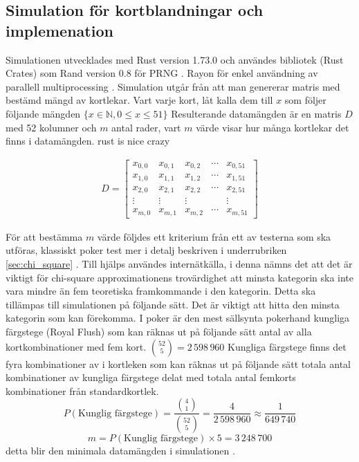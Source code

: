 \documentclass[a4paper]{article}
\begin{document}
\subsection{Simulation för kortblandningar och implemenation}

Simulationen utvecklades med Rust version 1.73.0 och användes bibliotek (Rust
Crates) som Rand version 0.8 för PRNG \parencite{rand_crate}. Rayon för enkel
användning av  parallell multiprocessing \parencite{rayon_crate}. Simulation
utgår från att man genererar matris med bestämd mängd av kortlekar. Vart varje
kort, låt kalla dem till $x$ som följer följande mängden $\{x \in \mathbb{N},  0 \leq x \leq 51 \}$
Resulterande datamängden är en matris $D$ med 52 kolumner och $m$ antal rader, vart
$m$ värde visar hur många kortlekar det finns i datamängden.
rust is nice crazy

\begin{align}
	D = \begin{bmatrix}
		x_{0,0} & x_{0,1} & x_{0,2} & \cdots & x_{0,51}\\ 
		x_{1,0} & x_{1,1} & x_{1,2} & \cdots & x_{1,51}\\
		x_{2,0} & x_{2,1} & x_{2,2} & \cdots & x_{2,51}\\
		\vdots & \vdots & \vdots & \; & \vdots \\
		x_{m,0} & x_{m,1} & x_{m,2} & \cdots & x_{m,51}
	\end{bmatrix}
\end{align}

För att bestämma $m$ värde följdes ett kriterium från ett av testerna som ska
utföras, klassiskt poker test mer i  detalj beskriven i underrubriken
\ref{sec:chi_square} . Till hjälps användes \parencite{nist} internätkälla, i
denna nämns det att det är viktigt för chi-square approximationens trovärdighet
att minsta kategorin ska inte vara mindre än fem teoretiska framkommande i den
kategorin. Detta ska tillämpas till simulationen på följande sätt. Det är
viktigt att hitta den minsta kategorin som kan förekomma. I poker är den mest
sällsynta pokerhand kungliga färgstege (Royal Flush) som kan räknas ut på
följande sätt antal av alla kortkombinationer med fem kort. $\binom{52}{5} =
2\,598\,960$ Kungliga färgstege finns det fyra  kombinationer av i kortleken
som kan räknas ut på följande sätt totala antal kombinationer av kungliga
färgstege delat med totala antal femkorts kombinationer från standardkortlek.
$$ P(\text{Kunglig färgstege}) =  \frac{\binom{4}{1}}{\binom{52}{5}} =
\frac{4}{2\,598\,960} \approx \frac{1}{649\,740} $$ $$m = P(\text{Kunglig
färgstege})  \times 5 = 3\,248\,700$$ detta blir den minimala datamängden i simulationen
.
\end{document}
